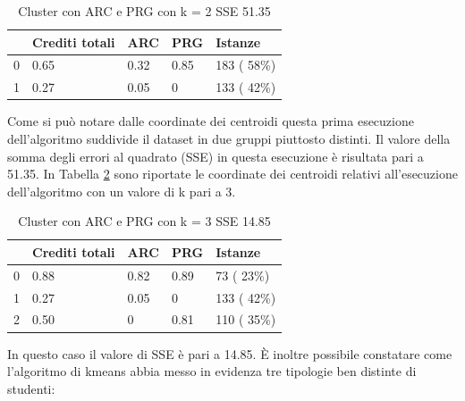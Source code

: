 \documentclass[12pt]{article}
\begin{document}
\begin{table}[ht]
	\centering
	\begin{tabular}{@{}lllll@{}}
	\toprule
	  & Crediti totali & ARC  & PRG  & Istanze\\ \midrule
	0 & 0.65           & 0.32 & 0.85 & 183 ( 58\%)\\
	1 & 0.27           & 0.05 & 0    & 133 ( 42\%)\\ \bottomrule
	\end{tabular}
	\caption{Cluster con ARC e PRG con k = 2 SSE 51.35}
	\label{c2AP}
\end{table}
Come si può notare dalle coordinate dei centroidi questa prima esecuzione dell'algoritmo suddivide il dataset in due gruppi piuttosto distinti.
Il valore della somma degli errori al quadrato (SSE) in questa esecuzione è risultata pari a 51.35.
In Tabella \ref{c3AP} sono riportate le coordinate dei centroidi relativi all'esecuzione dell'algoritmo con un valore di k pari a 3.
\begin{table}[ht]
	\centering
	\begin{tabular}{@{}lllll@{}}
	\toprule
	  & Crediti totali & ARC  & PRG  & Istanze\\ \midrule
	0 & 0.88           & 0.82 & 0.89 & 73 ( 23\%)\\
	1 & 0.27           & 0.05 & 0    & 133 ( 42\%)\\
	2 & 0.50           & 0    & 0.81 & 110 ( 35\%)\\ \bottomrule
	\end{tabular}
	\caption{Cluster con ARC e PRG con k = 3 SSE 14.85}
	\label{c3AP}
\end{table}
In questo caso il valore di SSE è pari a 14.85. È inoltre possibile constatare come l'algoritmo di kmeans abbia messo in evidenza tre tipologie ben distinte di studenti:
\end{document}
